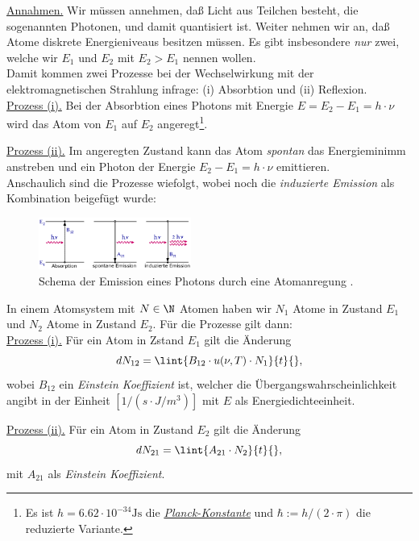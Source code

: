 \documentclass{subfiles}
\begin{document}
                \noindent\underline{Annahmen.} Wir müssen annehmen, daß Licht aus Teilchen besteht, die sogenannten Photonen, und damit quantisiert ist. Weiter nehmen wir an, daß Atome diskrete Energieniveaus besitzen müssen. Es gibt insbesondere \emph{nur} zwei, welche wir $E_1$ und $E_2$ mit $E_2>E_1$ nennen wollen. \\

                Damit kommen zwei Prozesse bei der Wechselwirkung mit der elektromagnetischen Strahlung infrage: (i) Absorbtion und (ii) Reflexion. \\

                \noindent\underline{Prozess (i).} Bei der Absorbtion eines Photons mit Energie $E=E_2-E_1= h\cdot\nu$ wird das Atom von $E_1$ auf $E_2$ angeregt\footnote{Es ist $h=6.62\cdot 10^{-34}\si{\joule\second}$ die \href{https://de.wikipedia.org/wiki/Planck-Konstante}{\emph{Planck-Konstante}} und $\hbar:=h/(2\cdot\pi)$ die reduzierte Variante.}.

                \noindent\underline{Prozess (ii).} Im angeregten Zustand kann das Atom \emph{spontan} das Energieminimm anstreben und ein Photon der Energie $E_2-E_1=h\cdot\nu$ emittieren. \\

                Anschaulich sind die Prozesse wiefolgt, wobei noch die \emph{induzierte Emission} als Kombination beigefügt wurde:
                \begin{figure}
                    \centering
                    \includegraphics[width=5cm]{Bilddateien/AtomPhotonEmission.gif}
                    \caption[short]{Schema der Emission eines Photons durch eine Atomanregung \cite{uniulm:PlanckStrahlung}.}
                \end{figure}
                In einem Atomsystem mit $N\in\N$ Atomen haben wir $N_1$ Atome in Zustand $E_1$ und $N_2$ Atome in Zustand $E_2$. Für die Prozesse gilt dann:\\

                \noindent\underline{Prozess (i).} Für ein Atom in Zstand $E_1$ gilt die Änderung 
                \[dN_{12} =\lint{B_{12}\cdot u(\nu,T)\cdot N_1}{t}{},\]
                wobei $B_{12}$ ein \emph{Einstein Koeffizient} ist, welcher die Übergangswahrscheinlichkeit angibt in der Einheit $[1/(s\cdot J/m^3)]$ mit $E$ als Energiedichteeinheit. 

                \noindent\underline{Prozess (ii).} Für ein Atom in Zustand $E_2$ gilt die Änderung
                \[dN_{21} = \lint{A_{21}\cdot N_2}{t}{},\]
                mit $A_{21}$ als \emph{Einstein Koeffizient}. 
\end{document}

